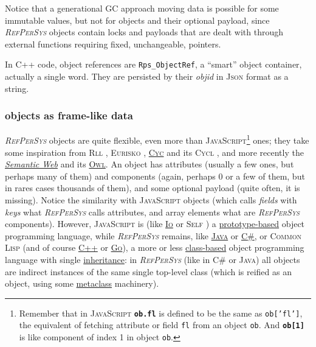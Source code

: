 \documentclass[11pt,a4paper,svgnames]{article}
\newcommand{\RefPerSys}{{\textit{\textsc{RefPerSys}}}}
\begin{document}
Notice that a generational GC approach moving data is possible for
some immutable values, but not for objects and their optional payload,
since {\RefPerSys} objects contain locks and payloads that are dealt
with through external functions requiring fixed, unchangeable, pointers.

In C++ code, object references are \texttt{Rps\_ObjectRef}, a
``smart'' object container, actually a single word. They are persisted
by their \textit{objid} in \textsc{Json} format as a string.

\subsubsection{objects as frame-like data}
\label{subsubsec:obj-frame}

{\RefPerSys} objects are quite flexible, even more than
\textsc{JavaScript}\footnote{Remember that in \textsc{JavaScript}
\textbf{\texttt{ob.fl}} is defined to be the same as
\texttt{ob['fl']}, the equivalent of fetching attribute or field
\texttt{fl} from an object \texttt{ob}. And \textbf{\texttt{ob[1]}} is
like component of index 1 in object \texttt{ob}.} ones; they take some
inspiration from \textsc{Rll} \cite{greiner:1980:representation},
\textsc{Eurisko} \cite{Lenat:1983:Eurisko, Lenat:1983:theory},
\href{https://en.wikipedia.org/wiki/Cyc}{\textsc{Cyc}} and its
\textsc{Cycl} \cite{Lenat:1991:ev-cycl}, and more recently the
\href{https://en.wikipedia.org/wiki/Semantic_Web}{\textit{Semantic
    Web}} and its
\href{https://www.w3.org/TR/owl-ref/}{\textsc{Owl}}. An object has
attributes (usually a few ones, but perhaps many of them) and
components (again, perhaps 0 or a few of them, but in rares cases
thousands of them), and some optional payload (quite often, it is
missing). Notice the similarity with \textsc{JavaScript} objects
(which calls \emph{fields} with \emph{keys} what {\RefPerSys} calls
attributes, and array elements what are {\RefPerSys}
components). However, \textsc{JavaScript} is (like
\href{http://iolanguage.com/}{\textsc{Io}} or \textsc{Self}
\cite{chambers:1991:efficient}) a
\href{https://en.wikipedia.org/wiki/Prototype-based_programming}{prototype-based}
object programming language, while {\RefPerSys} remains, like
\href{https://en.wikipedia.org/wiki/Java_(programming_language)}{\textsc{Java}}
or
\href{https://en.wikipedia.org/wiki/C_Sharp_(programming_language)}{\textsc{C\#}},
or \textsc{Common Lisp} (and of course
\href{https://en.cppreference.com/w/cpp}{\textsc{C++}} or
\href{https://golang.org/}{\textsc{Go}}), a more or less
\href{https://en.wikipedia.org/wiki/Class_(computer_programming)}{class-based}
object programming language with single
\href{https://en.wikipedia.org/wiki/Inheritance_(object-oriented_programming)}{inheritance}:
in {\RefPerSys} (like in \textsc{C\#} or \textsc{Java}) all objects
are indirect instances of the same single top-level class (which is
reified as an object, using some
\href{https://en.wikipedia.org/wiki/Metaclass}{metaclass} machinery).
\end{document}
